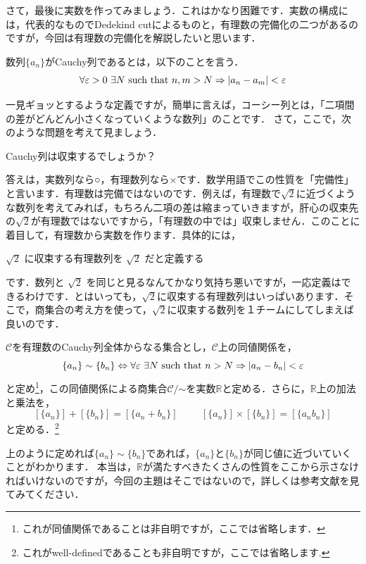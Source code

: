 さて，最後に実数を作ってみましょう．これはかなり困難です．実数の構成には，代表的なものでDedekind cutによるものと，有理数の完備化の二つがあるのですが，今回は有理数の完備化を解説したいと思います．
\begin{defi}[Cauchy列]
 数列$\{a_n\}$がCauchy列であるとは，以下のことを言う．
 \[
  \forall \varepsilon >0 \ \exists N\  {\rm such\ that}\ n,m>N \Rightarrow |a_n-a_m|<\varepsilon
 \]
\end{defi}
一見ギョッとするような定義ですが，簡単に言えば，コーシー列とは，「二項間の差がどんどん小さくなっていくような数列」のことです．
さて，ここで，次のような問題を考えて見ましょう．
\begin{center}
 Cauchy列は収束するでしょうか？
\end{center}
答えは，実数列なら○，有理数列なら×です．数学用語でこの性質を「完備性」と言います．有理数は完備ではないのです．例えば，有理数で$\sqrt{2}$に近づくような数列を考えてみれば，もちろん二項の差は縮まっていきますが，肝心の収束先の$\sqrt{2}$が有理数ではないですから，「有理数の中では」収束しません．このことに着目して，有理数から実数を作ります．具体的には，
\begin{center}
  $\sqrt{2}$ に収束する有理数列を $\sqrt{2}$ だと定義する
\end{center}
です．数列と $\sqrt{2}$ を同じと見るなんてかなり気持ち悪いですが，一応定義はできるわけです．とはいっても，$\sqrt{2}$に収束する有理数列はいっぱいあります．そこで，商集合の考え方を使って，$\sqrt{2}$に収束する数列を１チームにしてしまえば良いのです．
\begin{defi}[実数]
$\mathcal{C}$を有理数のCauchy列全体からなる集合とし，$\mathcal{C}$上の同値関係を，
 \[
 \{a_n\}\sim\{b_n\}\Leftrightarrow \forall\varepsilon\  \exists N\  {\rm such\ that}\ n>N\Rightarrow |a_n-b_n|<\varepsilon
 \]
 と定め\footnote{これが同値関係であることは非自明ですが，ここでは省略します．}，この同値関係による商集合$\mathcal{C}/\mathord{\sim}$を実数$\mathbb{R}$と定める．さらに，$\mathbb{R}$上の加法と乗法を，
 \[
  [\{a_n\}]+[\{b_n\}]=[\{a_n+b_n\}]\hspace{1cm}[\{a_n\}]\times[\{b_n\}]=[\{a_nb_n\}]
 \]
 と定める．\footnote{これがwell-definedであることも非自明ですが，ここでは省略します.}
\end{defi}

上のように定めれば$\{a_n\}\sim\{b_n\}$であれば，$\{a_n\}$と$\{b_n\}$が同じ値に近づいていくことがわかります．
本当は，$\mathbb{R}$が満たすべきたくさんの性質をここから示さなければいけないのですが，今回の主題はそこではないので，詳しくは参考文献を見てみてください．

